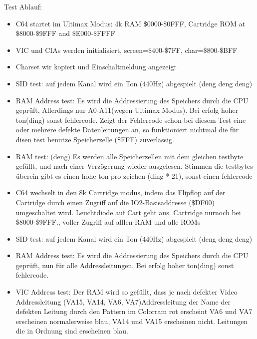 \documentclass[11pt]{article} %
\begin{document}
Test Ablauf:
\begin{itemize}
	\item C64 startet im Ultimax Modus: 4k RAM \$0000-\$0FFF, Cartridge ROM at \$8000-\$9FFF and \$E000-\$FFFF
	\item VIC und CIAs werden initialisiert, screen=\$400-\$7FF, char=\$800-\$BFF
	\item Charset wir kopiert und Einschaltmeldung angezeigt
	\item SID test: auf jedem Kanal wird ein Ton (440Hz) abgespielt (deng deng deng)
	\item RAM Address test: Es wird die Addressierung des Speichers durch die CPU geprüft, Allerdings nur A0-A11(wegen Ultimax Modus). Bei erfolg hoher ton(ding) sonst fehlercode. Zeigt der Fehlercode schon bei diesem Test eine oder mehrere defekte Datenleitungen an, so funktioniert nichtmal die für disen test benutze Speicherzelle (\$FFF) zuverlässig.
	\item RAM test: (deng) Es werden alle Speicherzellen mit dem gleichen testbyte gefüllt, und nach einer Verzögerung wieder ausgelesen. Stimmen die testbytes überein gibt es einen hohe ton pro zeichen (ding * 21), sonst einen fehlercode
	\item C64 wechselt in den 8k Cartridge modus, indem das Flipflop auf der Cartridge durch einen Zugriff auf die IO2-Basisaddresse (\$DF00) umgeschaltet wird. Leuchtdiode auf Cart geht aus. Cartridge nurnoch bei \$8000-\$9FFF., voller Zugriff auf alllen RAM und alle ROMs
	\item SID test: auf jedem Kanal wird ein Ton (440Hz) abgespielt (deng deng deng)
	\item RAM Address test: Es wird die Addressierung des Speichers durch die CPU geprüft, nun für alle Addressleitungen. Bei erfolg hoher ton(ding) sonst fehlercode.
	\item VIC Address test: Der RAM wird so gefüllt, dass je nach defekter Video Addressleitung (VA15, VA14, VA6, VA7)Addressleitung der Name der defekten Leitung durch den Pattern im Colorram rot erscheint VA6 und VA7 erscheinen normalerweise blau, VA14 und VA15 erscheinen nicht. Leitungen die in Ordnung sind erscheinen blau.

\end{itemize}
\end{document}
